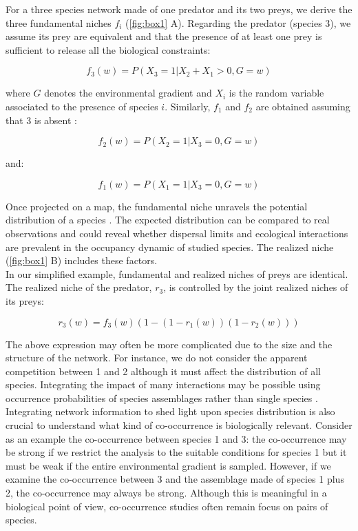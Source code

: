 For a three species network made of one predator and its two preys, we
derive the three fundamental niches \(f_i\) (\ref{fig:box1} A).
Regarding the predator (species 3), we assume its prey are equivalent
and that the presence of at least one prey is sufficient to release all
the biological constraints:

\[f_3(w)=P(X_3=1|X_2+X_1>0, G=w)\]

where \(G\) denotes the environmental gradient and \(X_i\) is the random
variable associated to the presence of species \(i\). Similarly, \(f_1\)
and \(f_2\) are obtained assuming that 3 is absent :

\[f_2(w)=P(X_2=1|X_3=0, G=w)\]

and:

\[f_1(w)=P(X_1=1|X_3=0, G=w)\]

Once projected on a map, the fundamental niche unravels the potential
distribution of a species \citep{Kearney_2004}. The expected
distribution can be compared to real observations and could reveal
whether dispersal limits and ecological interactions are prevalent in
the occupancy dynamic of studied species. The realized niche
(\ref{fig:box1} B) includes these factors.\\
In our simplified example, fundamental and realized niches of preys are
identical. The realized niche of the predator, \(r_3\), is controlled by
the joint realized niches of its preys:

\[r_3(w)=f_3(w)\left(1-(1-r_1(w))(1-r_2(w))\right)\]

The above expression may often be more complicated due to the size and
the structure of the network. For instance, we do not consider the
apparent competition between 1 and 2 although it must affect the
distribution of all species. Integrating the impact of many interactions
may be possible using occurrence probabilities of species assemblages
rather than single species \citep{Cazelles_2015}. Integrating network
information to shed light upon species distribution is also crucial to
understand what kind of co-occurrence is biologically relevant. Consider
as an example the co-occurrence between species 1 and 3: the
co-occurrence may be strong if we restrict the analysis to the suitable
conditions for species 1 but it must be weak if the entire environmental
gradient is sampled. However, if we examine the co-occurrence between 3
and the assemblage made of species 1 plus 2, the co-occurrence may
always be strong. Although this is meaningful in a biological point of
view, co-occurrence studies often remain focus on pairs of species.

